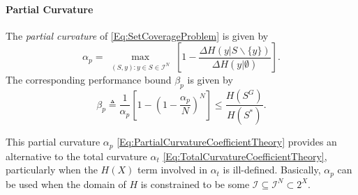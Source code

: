 \documentclass[letterpaper, 10 pt, conference]{ieeeconf}
\begin{document}



\paragraph{\textbf{Partial Curvature \cite{Liu2018}}}
\label{SubSec:PartialCurvature}

The \emph{partial curvature} of \eqref{Eq:SetCoverageProblem} is given by
\begin{equation}\label{Eq:PartialCurvatureCoefficientTheory}
    \alpha_p = 
    \max_{\substack{(S,y): y \in S \in \mathcal{I}^N}}\left[1-\frac{\Delta H(y \vert S \backslash \{y\}) }{\Delta H(y \vert \emptyset)}\right].
\end{equation}
The corresponding performance bound $\beta_p$ is given by 
\begin{equation}\label{Eq:PartialCurvatureBoundTheory}
    \beta_p \triangleq \frac{1}{\alpha_p}\left[1-\left(1-\frac{\alpha_p}{N}\right)^N\right] \leq \frac{H(S^G)}{H(S^*)}.
\end{equation}


This partial curvature $\alpha_p$ \eqref{Eq:PartialCurvatureCoefficientTheory} provides an alternative to the total curvature $\alpha_t$ \eqref{Eq:TotalCurvatureCoefficientTheory}, particularly when the $H(X)$ term involved in $\alpha_t$ is ill-defined. Basically, $\alpha_p$ can be used when the domain of $H$ is constrained to be some $\mathcal{I} \subseteq \mathcal{I}^N \subset 2^X$. 
\end{document}
